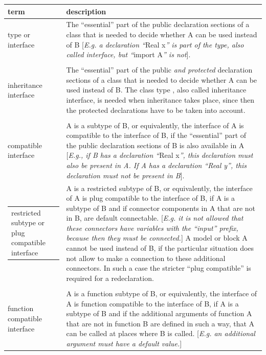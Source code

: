 \documentclass[10pt,a4paper]{report}
\begin{document}
\begin{longtable}{|p{4cm}|p{8cm}|} 
\hline \endhead
\textbf{term} & \textbf{description}\\ \hline
type or interface
& The ``essential'' part of the public declaration sections of a class
that is needed to decide whether A can be used instead of B
{[}\emph{E.g. a declaration ``}Real x\emph{'' is part of the type, also
called interface, but ``}import A\emph{'' is not}{]}.
\\ \hline
\begin{tabular}{@{}p{4cm}@{}}
class type or\\
inheritance interface
\end{tabular}
& 
The ``essential'' part of the public \emph{and protected} declaration
sections of a class that is needed to decide whether A can be used
instead of B. The class type , also called inheritance interface, is
needed when inheritance takes place, since then the protected
declarations have to be taken into account.\\ \hline
\begin{tabular}{@{}p{4cm}@{}}
subtype or\\
compatible interface
\end{tabular} & 
A is a subtype of B, or equivalently, the interface of A is compatible
to the interface of B, if the ``essential'' part of the public
declaration sections of B is also available in A {[}\emph{E.g., if B has
a declaration ``}Real x\emph{'', this declaration must also be present
in A. If A has a declaration ``Real y'', this declaration must not be
present in B}{]}.\\ \hline
\begin{tabular}{@{}p{4cm}@{}}
restricted subtype or
plug compatible interface
\end{tabular} & 
A is a restricted subtype of B, or equivalently, the interface of A is
plug compatible to the interface of B, if A is a subtype of B and if
connector components in A that are not in B, are default connectable.
{[}\emph{E.g. it is not allowed that these connectors have variables
with the ``input'' prefix, because then they must be connected.}{]} A
model or block A cannot be used instead of B, if the particular
situation does not allow to make a connection to these additional
connectors. In such a case the stricter ``plug compatible'' is required
for a redeclaration.\\ \hline
\begin{tabular}{@{}p{4cm}@{}}
function subtype or\\
function compatible interface
\end{tabular} & 
A is a function subtype of B, or equivalently, the interface of A is
function compatible to the interface of B, if A is a subtype of B and if
the additional arguments of function A that are not in function B are
defined in such a way, that A can be called at places where B is called.
{[}\emph{E.g. an additional argument must have a default
value.}{]}\\ \hline
\end{longtable}
\end{document}
